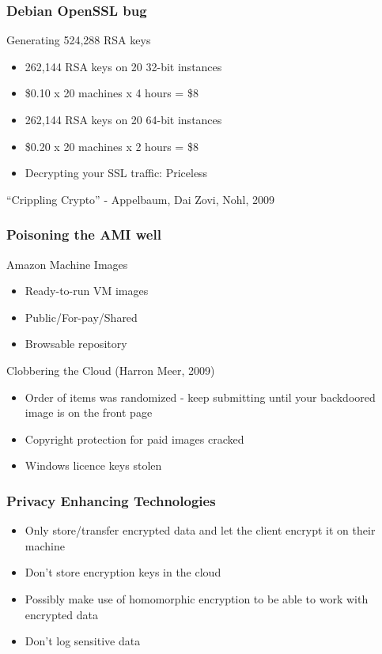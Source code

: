 \documentclass{beamer}
\begin{document}
\begin{frame}
    \frametitle{Debian OpenSSL bug}
Generating 524,288 RSA keys
    \begin{itemize}
    \item 262,144 RSA keys on 20 32-bit instances
    \item \$0.10 x 20 machines x 4 hours = \$8
    \item 262,144 RSA keys on 20 64-bit instances
    \item \$0.20 x 20 machines x 2 hours = \$8
    \item Decrypting your SSL traffic: Priceless
    \end{itemize}
    \footnotesize{``Crippling Crypto'' - Appelbaum, Dai Zovi, Nohl, 2009}
\end{frame}

\begin{frame}
    \frametitle{Poisoning the AMI well}
    Amazon Machine Images
    \begin{itemize}
      \item Ready-to-run VM images
      \item Public/For-pay/Shared
      \item Browsable repository
    \end{itemize}

    Clobbering the Cloud (Harron Meer, 2009)
    \begin{itemize}
      \item Order of items was randomized - keep submitting until your backdoored image is on the front page
      \item Copyright protection for paid images cracked
      \item Windows licence keys stolen
    \end{itemize}
\end{frame}

\begin{frame}
    \frametitle{Privacy Enhancing Technologies}
    \begin{itemize}
      \item Only store/transfer encrypted data and let the client encrypt it on their machine
      \item Don't store encryption keys in the cloud
      \item Possibly make use of homomorphic encryption to be able to work with encrypted data
      \item Don't log sensitive data
    \end{itemize}
\end{frame}
\end{document}
